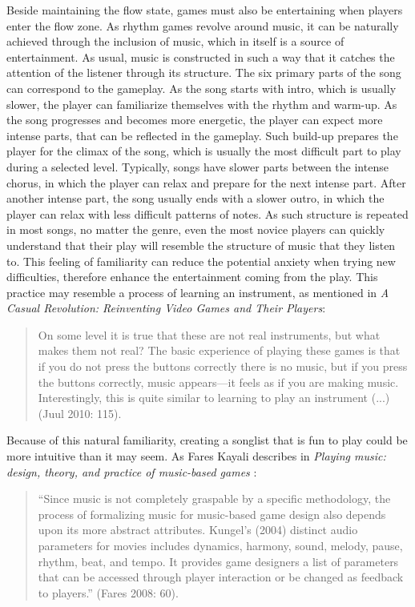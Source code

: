 Beside maintaining the flow state, games must also be entertaining when players enter the flow zone. As rhythm games revolve around music, it can be naturally achieved through the inclusion of music, which in itself is a source of entertainment. As usual, music is constructed in such a way that it catches the attention of the listener through its structure. The six primary parts of the song can correspond to the gameplay. As the song starts with intro, which is usually slower, the player can familiarize themselves with the rhythm and warm-up. As the song progresses and becomes more energetic, the player can expect more intense parts, that can be reflected in the gameplay. Such build-up prepares the player for the climax of the song, which is usually the most difficult part to play during a selected level. Typically, songs have slower parts between the intense chorus, in which the player can relax and prepare for the next intense part. After another intense part, the song usually ends with a slower outro, in which the player can relax with less difficult patterns of notes. As such structure is repeated in most songs, no matter the genre, even the most novice players can quickly understand that their play will resemble the structure of music that they listen to. This feeling of familiarity can reduce the potential anxiety when trying new difficulties, therefore enhance the entertainment coming from the play. This practice may resemble a process of learning an instrument, as mentioned in \textit{A Casual Revolution: Reinventing Video Games and Their Players}\cite{casualrevolution}:
\begin{quote}
    On some level it is true that these are not real instruments, but what makes them not real? The basic experience of playing these games is that if you do not press the buttons correctly there is no music, but if you press the buttons correctly, music appears—it feels as if you are making music. Interestingly, this is quite similar to learning to play an instrument (...) (Juul 2010: 115).
\end{quote}

Because of this natural familiarity, creating a songlist that is fun to play could be more intuitive than it may seem. As Fares Kayali describes in \textit{Playing music: design, theory, and practice of music-based games} \cite{faresplayingmusic}: 

\begin{quote}
    ``Since music is not completely graspable by a specific methodology, the process of formalizing music for music-based game design also depends upon its more abstract attributes. Kungel’s (2004) distinct audio parameters for movies includes dynamics, harmony, sound, melody, pause, rhythm, beat, and tempo. It provides game designers a list of parameters that can be accessed through player interaction or be changed as feedback to players.'' (Fares 2008: 60).
\end{quote}

